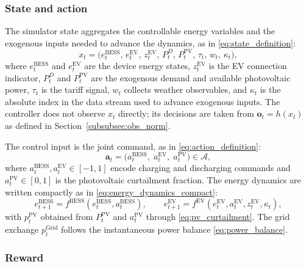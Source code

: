 \documentclass[preprint,12pt, 3p]{elsarticle}
\begin{document}
\subsubsection{State and action}
\label{subsubsec:mdp_state_action}

The simulator state aggregates the controllable energy variables and the exogenous inputs needed to advance the dynamics, as in \eqref{eq:state_definition}:
\begin{equation}
\label{eq:state_definition}
x_t =
\Big(
e^{\text{BESS}}_t,\,
e^{\text{EV}}_t,\,
z^{\text{EV}}_t,\,
P^{D}_t,\,
P^{\text{PV}}_t,\,
\tau_t,\,
w_t,\,
\kappa_t
\Big),
\end{equation}
where $e^{\text{BESS}}_t$ and $e^{\text{EV}}_t$ are the device energy states, $z^{\text{EV}}_t$ is the \gls{EV} connection indicator, $P^{D}_t$ and $P^{\text{PV}}_t$ are the exogenous demand and available photovoltaic power, $\tau_t$ is the tariff signal, $w_t$ collects weather observables, and $\kappa_t$ is the absolute index in the data stream used to advance exogenous inputs. The controller does not observe $x_t$ directly; its decisions are taken from $\mathbf{o}_t = h(x_t)$ as defined in Section~\ref{subsubsec:obs_norm}.

The control input is the joint command, as in \eqref{eq:action_definition}:
\begin{equation}
\label{eq:action_definition}
\mathbf{a}_t =
\Big(a^{\text{BESS}}_t,\;a^{\text{EV}}_t,\;a^{\text{PV}}_t\Big)\in\mathcal{A},
\end{equation}
where $a^{\text{BESS}}_t, a^{\text{EV}}_t \in [-1,1]$ encode charging and discharging commands and $a^{\text{PV}}_t \in [0,1]$ is the photovoltaic curtailment fraction. The energy dynamics are written compactly as in \eqref{eq:energy_dynamics_compact}:
\begin{equation}
\label{eq:energy_dynamics_compact}
e^{\text{BESS}}_{t+1} = f^{\text{BESS}}\!\left(e^{\text{BESS}}_t, a^{\text{BESS}}_t\right),\qquad
e^{\text{EV}}_{t+1} = f^{\text{EV}}\!\left(e^{\text{EV}}_t, a^{\text{EV}}_t, z^{\text{EV}}_t, \kappa_t\right),
\end{equation}
with $p_t^{\text{PV}}$ obtained from $P_t^{\text{PV}}$ and $a_t^{\text{PV}}$ through \eqref{eq:pv_curtailment}. The grid exchange $p_t^{\text{Grid}}$ follows the instantaneous power balance \eqref{eq:power_balance}.

\subsubsection{Reward}
\label{subsubsec:mdp_reward}
\end{document}

